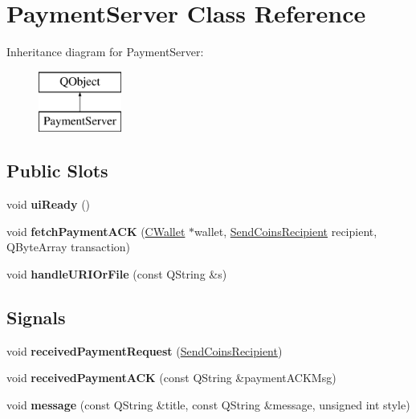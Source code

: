 \hypertarget{class_payment_server}{}\section{Payment\+Server Class Reference}
\label{class_payment_server}
Inheritance diagram for Payment\+Server\+:\begin{figure}[H]
\begin{center}
\leavevmode
\includegraphics[height=2.000000cm]{class_payment_server}
\end{center}
\end{figure}
\subsection*{Public Slots}
\begin{DoxyCompactItemize}
\item 
\mbox{\label{class_payment_server_abb6c65fabbf97ba95381997ca9cd6993}} 
void {\bfseries ui\+Ready} ()
\item 
\mbox{\label{class_payment_server_ab846f9e8778e5cc878b644133e8628f1}} 
void {\bfseries fetch\+Payment\+A\+CK} (\mbox{\hyperlink{class_c_wallet}{C\+Wallet}} $\ast$wallet, \mbox{\hyperlink{class_send_coins_recipient}{Send\+Coins\+Recipient}} recipient, Q\+Byte\+Array transaction)
\item 
\mbox{\label{class_payment_server_adf4f844b3ce7f053690fd9260210640d}} 
void {\bfseries handle\+U\+R\+I\+Or\+File} (const Q\+String \&s)
\end{DoxyCompactItemize}
\subsection*{Signals}
\begin{DoxyCompactItemize}
\item 
\mbox{\label{class_payment_server_aa8b9cb16623d307e0cdc47de2dfe7e56}} 
void {\bfseries received\+Payment\+Request} (\mbox{\hyperlink{class_send_coins_recipient}{Send\+Coins\+Recipient}})
\item 
\mbox{\label{class_payment_server_a3566aabe525fb1b4a25975d7564abec6}} 
void {\bfseries received\+Payment\+A\+CK} (const Q\+String \&payment\+A\+C\+K\+Msg)
\item 
\mbox{\label{class_payment_server_a5f6427a6b665cbce3cd42f04feb9b183}} 
void {\bfseries message} (const Q\+String \&title, const Q\+String \&message, unsigned int style)
\end{DoxyCompactItemize}
